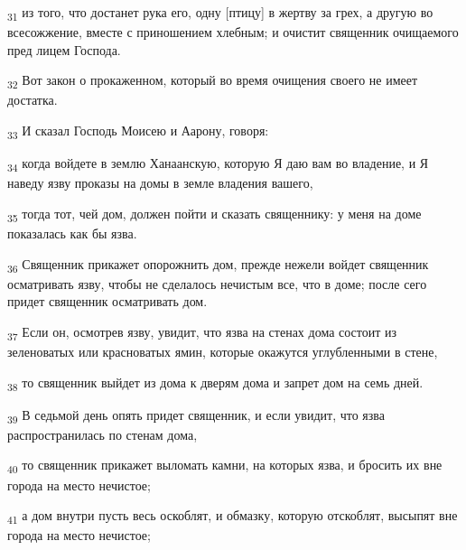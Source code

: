 \begin{tcolorbox}
\textsubscript{31} из того, что достанет рука его, одну [птицу] в жертву за грех, а другую во всесожжение, вместе с приношением хлебным; и очистит священник очищаемого пред лицем Господа.
\end{tcolorbox}
\begin{tcolorbox}
\textsubscript{32} Вот закон о прокаженном, который во время очищения своего не имеет достатка.
\end{tcolorbox}
\begin{tcolorbox}
\textsubscript{33} И сказал Господь Моисею и Аарону, говоря:
\end{tcolorbox}
\begin{tcolorbox}
\textsubscript{34} когда войдете в землю Ханаанскую, которую Я даю вам во владение, и Я наведу язву проказы на домы в земле владения вашего,
\end{tcolorbox}
\begin{tcolorbox}
\textsubscript{35} тогда тот, чей дом, должен пойти и сказать священнику: у меня на доме показалась как бы язва.
\end{tcolorbox}
\begin{tcolorbox}
\textsubscript{36} Священник прикажет опорожнить дом, прежде нежели войдет священник осматривать язву, чтобы не сделалось нечистым все, что в доме; после сего придет священник осматривать дом.
\end{tcolorbox}
\begin{tcolorbox}
\textsubscript{37} Если он, осмотрев язву, увидит, что язва на стенах дома состоит из зеленоватых или красноватых ямин, которые окажутся углубленными в стене,
\end{tcolorbox}
\begin{tcolorbox}
\textsubscript{38} то священник выйдет из дома к дверям дома и запрет дом на семь дней.
\end{tcolorbox}
\begin{tcolorbox}
\textsubscript{39} В седьмой день опять придет священник, и если увидит, что язва распространилась по стенам дома,
\end{tcolorbox}
\begin{tcolorbox}
\textsubscript{40} то священник прикажет выломать камни, на которых язва, и бросить их вне города на место нечистое;
\end{tcolorbox}
\begin{tcolorbox}
\textsubscript{41} а дом внутри пусть весь оскоблят, и обмазку, которую отскоблят, высыпят вне города на место нечистое;
\end{tcolorbox}
